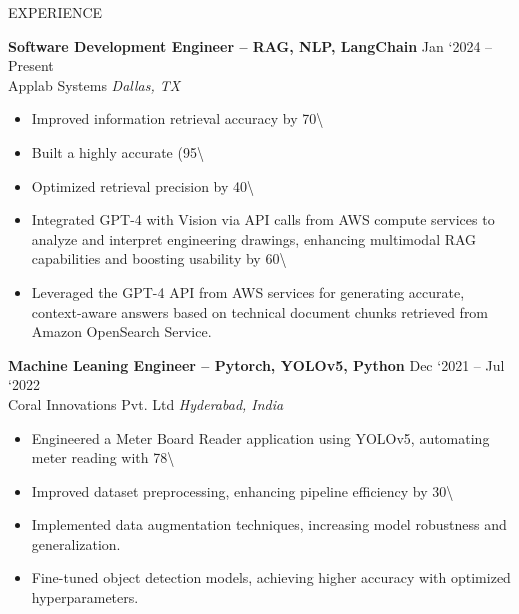 \documentclass{resume}
\begin{document}
\begin{rSection}{EXPERIENCE}

\textbf{Software Development Engineer – RAG, NLP, LangChain} \hfill Jan ‘2024 – Present\\
Applab Systems \hfill \textit{Dallas, TX}
\begin{itemize}
    \itemsep -3pt {} 
     \item Improved information retrieval accuracy by 70\textbackslash{}%
     \item Built a highly accurate (95\textbackslash{}%
     \item Optimized retrieval precision by 40\textbackslash{}%
     \item Integrated GPT-4 with Vision via API calls from AWS compute services to analyze and interpret engineering drawings, enhancing multimodal RAG capabilities and boosting usability by 60\textbackslash{}%
     \item Leveraged the GPT-4 API from AWS services for generating accurate, context-aware answers based on technical document chunks retrieved from Amazon OpenSearch Service.
\end{itemize}

\textbf{Machine Leaning Engineer – Pytorch, YOLOv5, Python} \hfill Dec ‘2021 – Jul ‘2022\\
Coral Innovations Pvt. Ltd \hfill \textit{Hyderabad, India}
\begin{itemize}
    \itemsep -3pt {} 
     \item Engineered a Meter Board Reader application using YOLOv5, automating meter reading with 78\textbackslash{}%
     \item Improved dataset preprocessing, enhancing pipeline efficiency by 30\textbackslash{}%
     \item Implemented data augmentation techniques, increasing model robustness and generalization.
     \item Fine-tuned object detection models, achieving higher accuracy with optimized hyperparameters.
\end{itemize}

\end{rSection}
\end{document}
